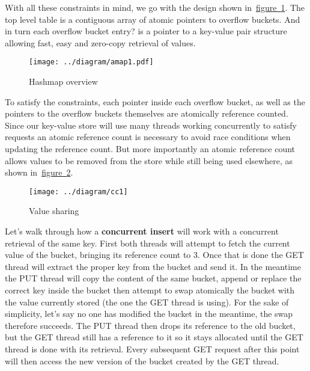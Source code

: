 With all these constraints in mind, we go with the design shown
in~\hyperref[fig:hashmap]{figure~\ref{fig:hashmap}}. The top level
table is a contiguous array of atomic pointers to overflow
buckets. And in turn each overflow bucket entry? is a pointer to a
key-value pair structure allowing fast, easy and zero-copy retrieval
of values.

\begin{figure}[htb!]
  \texttt{[image: ../diagram/amap1.pdf]}
  \caption{Hashmap overview}
  \label{fig:hashmap}
\end{figure}

To satisfy the constraints, each pointer inside each overflow bucket,
as well as the pointers to the overflow buckets themselves are
atomically reference counted. Since our key-value store will use many
threads working concurrently to satisfy requests an atomic reference
count is necessary to avoid race conditions when updating the
reference count. But more importantly an atomic reference count allows
values to be removed from the store while still being used elsewhere,
as shown
in~\hyperref[fig:value-sharing]{figure~\ref{fig:value-sharing}}.

\begin{figure}[htb!]
  \texttt{[image: ../diagram/cc1]}
  \caption{Value sharing}
  \label{fig:value-sharing}
\end{figure}


Let's walk through how a \textbf{concurrent insert} will work with a
concurrent retrieval of the same key. First both threads will attempt
to fetch the current value of the bucket, bringing its reference count
to 3. Once that is done the GET thread will extract the proper key
from the bucket and send it. In the meantime the PUT thread will copy
the content of the same bucket, append or replace the correct key
inside the bucket then attempt to swap atomically the bucket with the
value currently stored (the one the GET thread is using). For the sake
of simplicity, let's say no one has modified the bucket in the
meantime, the swap therefore succeeds. The PUT thread then drops its
reference to the old bucket, but the GET thread still has a reference
to it so it stays allocated until the GET thread is done with its
retrieval. Every subsequent GET request after this point will then
access the new version of the bucket created by the GET thread.


